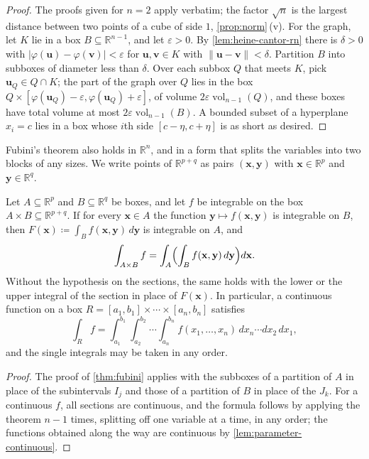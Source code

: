 \begin{proof}
The proofs given for $n=2$ apply verbatim; the factor $\sqrt n$ is the largest distance between two points of a cube of side $1$, \cref{prop:norm}\,(v). For the graph, let $K$ lie in a box $B\subseteq\mathbb R^{n-1}$, and let $\varepsilon>0$. By \cref{lem:heine-cantor-rn} there is $\delta>0$ with $|\varphi(\mathbf u)-\varphi(\mathbf v)|<\varepsilon$ for $\mathbf u,\mathbf v\in K$ with $\|\mathbf u-\mathbf v\|<\delta$. Partition $B$ into subboxes of diameter less than $\delta$. Over each subbox $Q$ that meets $K$, pick $\mathbf u_Q\in Q\cap K$; the part of the graph over $Q$ lies in the box $Q\times[\varphi(\mathbf u_Q)-\varepsilon,\varphi(\mathbf u_Q)+\varepsilon]$, of volume $2\varepsilon\operatorname{vol}_{n-1}(Q)$, and these boxes have total volume at most $2\varepsilon\operatorname{vol}_{n-1}(B)$. A bounded subset of a hyperplane $x_i=c$ lies in a box whose $i$th side $[c-\eta,c+\eta]$ is as short as desired.
\end{proof}

Fubini's theorem also holds in $\mathbb R^n$, and in a form that splits the variables into two blocks of any sizes. We write points of $\mathbb R^{p+q}$ as pairs $(\mathbf x,\mathbf y)$ with $\mathbf x\in\mathbb R^p$ and $\mathbf y\in\mathbb R^q$.

\begin{theorem}
\label{thm:fubini-n}
Let $A\subseteq\mathbb R^p$ and $B\subseteq\mathbb R^q$ be boxes, and let $f$ be integrable on the box $A\times B\subseteq\mathbb R^{p+q}$. If for every $\mathbf x\in A$ the function $\mathbf y\mapsto f(\mathbf x,\mathbf y)$ is integrable on $B$, then $F(\mathbf x)\coloneqq\int_Bf(\mathbf x,\mathbf y)\,d\mathbf y$ is integrable on $A$, and
\[
\int_{A\times B}f=\int_A\Bigl(\int_Bf(\mathbf x,\mathbf y)\,d\mathbf y\Bigr)d\mathbf x .
\]
Without the hypothesis on the sections, the same holds with the lower or the upper integral of the section in place of $F(\mathbf x)$. In particular, a continuous function on a box $R=[a_1,b_1]\times\cdots\times[a_n,b_n]$ satisfies
\[
\int_Rf=\int_{a_1}^{b_1}\int_{a_2}^{b_2}\cdots\int_{a_n}^{b_n}f(x_1,\ldots,x_n)\,dx_n\cdots dx_2\,dx_1 ,
\]
and the single integrals may be taken in any order.
\end{theorem}

\begin{proof}
The proof of \cref{thm:fubini} applies with the subboxes of a partition of $A$ in place of the subintervals $I_j$ and those of a partition of $B$ in place of the $J_k$. For a continuous $f$, all sections are continuous, and the formula follows by applying the theorem $n-1$ times, splitting off one variable at a time, in any order; the functions obtained along the way are continuous by \cref{lem:parameter-continuous}.
\end{proof}

